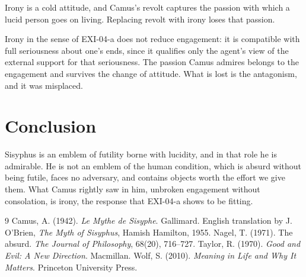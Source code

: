 \documentclass{situationist-preprint}
\begin{document}
\begin{objection}
Irony is a cold attitude, and Camus's revolt captures the passion with which a lucid person goes on living. Replacing revolt with irony loses that passion.
\end{objection}

\begin{reply}
Irony in the sense of EXI-04-a does not reduce engagement: it is compatible with full seriousness about one's ends, since it qualifies only the agent's view of the external support for that seriousness. The passion Camus admires belongs to the engagement and survives the change of attitude. What is lost is the antagonism, and it was misplaced.
\end{reply}

\section{Conclusion}

Sisyphus is an emblem of futility borne with lucidity, and in that role he is admirable. He is not an emblem of the human condition, which is absurd without being futile, faces no adversary, and contains objects worth the effort we give them. What Camus rightly saw in him, unbroken engagement without consolation, is irony, the response that EXI-04-a shows to be fitting.

\begin{thebibliography}{9}\small
{} Camus, A. (1942). \emph{Le Mythe de Sisyphe}. Gallimard. English translation by J. O'Brien, \emph{The Myth of Sisyphus}, Hamish Hamilton, 1955.
 Nagel, T. (1971). The absurd. \emph{The Journal of Philosophy}, 68(20), 716--727.
 Taylor, R. (1970). \emph{Good and Evil: A New Direction}. Macmillan.
 Wolf, S. (2010). \emph{Meaning in Life and Why It Matters}. Princeton University Press.
\end{thebibliography}
\end{document}
